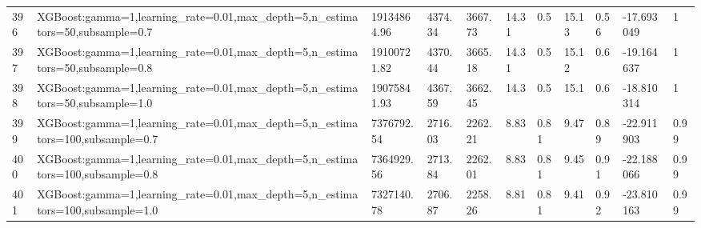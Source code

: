 \begin{longtable}{C{0.8cm} L{2cm} C{1.15cm} C{1.15cm} C{1.15cm} C{1.15cm} C{0.85cm} C{1.25cm} C{1.2cm} C{1.5cm} C{1.0cm}}
396 & XGBoost:\newline gamma=1,\newline learning\_rate=0.01,\newline max\_depth=5,\newline n\_estimators=50,\newline subsample=0.7 & 19134864.96 & 4374.34 & 3667.73 & 14.31 & 0.5 & 15.13 & 0.56 & -17.693049 & 1 \\
397 & XGBoost:\newline gamma=1,\newline learning\_rate=0.01,\newline max\_depth=5,\newline n\_estimators=50,\newline subsample=0.8 & 19100721.82 & 4370.44 & 3665.18 & 14.31 & 0.5 & 15.12 & 0.6 & -19.164637 & 1 \\
398 & XGBoost:\newline gamma=1,\newline learning\_rate=0.01,\newline max\_depth=5,\newline n\_estimators=50,\newline subsample=1.0 & 19075841.93 & 4367.59 & 3662.45 & 14.3 & 0.5 & 15.1 & 0.6 & -18.810314 & 1 \\
399 & XGBoost:\newline gamma=1,\newline learning\_rate=0.01,\newline max\_depth=5,\newline n\_estimators=100,\newline subsample=0.7 & 7376792.54 & 2716.03 & 2262.21 & 8.83 & 0.81 & 9.47 & 0.89 & -22.911903 & 0.99 \\
400 & XGBoost:\newline gamma=1,\newline learning\_rate=0.01,\newline max\_depth=5,\newline n\_estimators=100,\newline subsample=0.8 & 7364929.56 & 2713.84 & 2262.01 & 8.83 & 0.81 & 9.45 & 0.91 & -22.188066 & 0.99 \\
401 & XGBoost:\newline gamma=1,\newline learning\_rate=0.01,\newline max\_depth=5,\newline n\_estimators=100,\newline subsample=1.0 & 7327140.78 & 2706.87 & 2258.26 & 8.81 & 0.81 & 9.41 & 0.92 & -23.810163 & 0.99 \\

\end{longtable}
